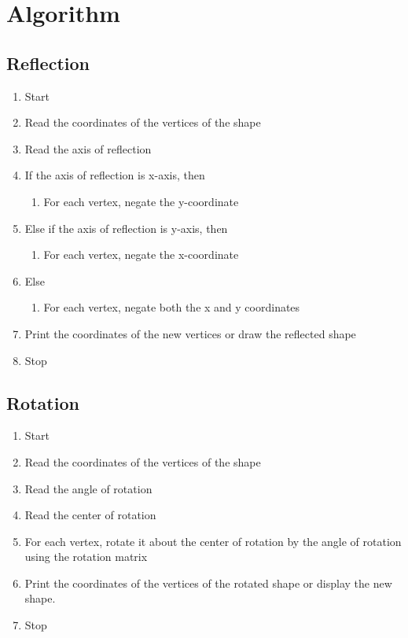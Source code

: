 \documentclass[12pt]{article}
\begin{document}
	\section{Algorithm}
	\subsection{Reflection}
	\begin{enumerate}
		\item Start
		\item Read the coordinates of the vertices of the shape
		\item Read the axis of reflection
		\item If the axis of reflection is x-axis, then
		\begin{enumerate}
			\item For each vertex, negate the y-coordinate
		\end{enumerate}
		\item Else if the axis of reflection is y-axis, then
		\begin{enumerate}
			\item For each vertex, negate the x-coordinate
		\end{enumerate}
		\item Else
		\begin{enumerate}
			\item For each vertex, negate both the x and y coordinates
		\end{enumerate}
		\item Print the coordinates of the new vertices or draw the reflected shape
		\item Stop
	\end{enumerate}

	\subsection{Rotation}
	\begin{enumerate}
		\item Start
		\item Read the coordinates of the vertices of the shape
		\item Read the angle of rotation
		\item Read the center of rotation
		\item For each vertex, rotate it about the center of rotation by the angle of rotation using the rotation matrix
		\item Print the coordinates of the vertices of the rotated shape or display the new shape.
		\item Stop
	\end{enumerate}
\end{document}
